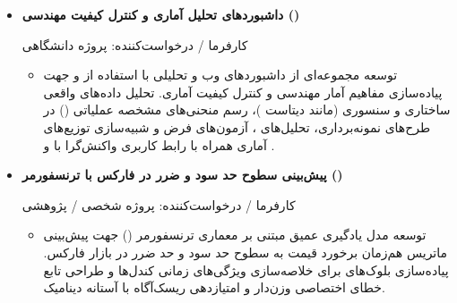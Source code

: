 \documentclass[10pt,a4paper]{article}
\newenvironment{projdesc}{%
  \begin{itemize}[label={}, leftmargin=2em, itemindent=0pt, nosep,
                  itemsep=0pt, topsep=3pt]%
}{\end{itemize}}
\newenvironment{cvblock}{%
  \begin{itemize}[label={}, leftmargin=2em, itemindent=0pt, nosep, itemsep=6pt, topsep=0pt]%
}{\end{itemize}}
\begin{document}
\begin{cvblock}
\item \textbf{\color{primary}داشبوردهای تحلیل آماری و کنترل کیفیت مهندسی ()}\par
{\small\color{muted}کارفرما / درخواست‌کننده: پروژه دانشگاهی}\par
\begin{projdesc}
  \item {\small توسعه مجموعه‌ای از داشبوردهای وب و تحلیلی با استفاده از  و  جهت پیاده‌سازی مفاهیم آمار مهندسی و کنترل کیفیت آماری. تحلیل داده‌های واقعی ساختاری و سنسوری (مانند دیتاست )، رسم منحنی‌های مشخصه عملیاتی () در طرح‌های نمونه‌برداری، تحلیل‌های ، آزمون‌های فرض و شبیه‌سازی توزیع‌های آماری همراه با رابط کاربری واکنش‌گرا با  و .}
\end{projdesc}
\vspace{2pt}
\hfill{}
\end{cvblock}

\begin{cvblock}
\item \textbf{\color{primary}پیش‌بینی سطوح حد سود و ضرر در فارکس با ترنسفورمر ()}\par
{\small\color{muted}کارفرما / درخواست‌کننده: پروژه شخصی / پژوهشی}\par
\begin{projdesc}
  \item {\small توسعه مدل یادگیری عمیق مبتنی بر معماری ترنسفورمر () جهت پیش‌بینی ماتریس هم‌زمان برخورد قیمت به سطوح حد سود و حد ضرر در بازار فارکس. پیاده‌سازی بلوک‌های  برای خلاصه‌سازی ویژگی‌های زمانی کندل‌ها و طراحی تابع خطای اختصاصی  وزن‌دار و امتیازدهی ریسک‌آگاه با آستانه دینامیک.}
\end{projdesc}
\vspace{2pt}
\hfill{}
\end{cvblock}
\end{document}
